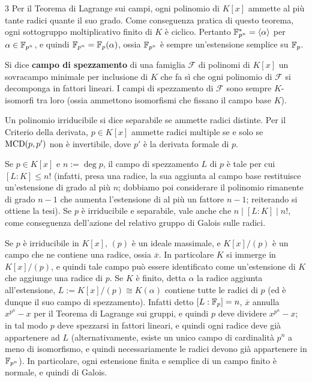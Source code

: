 \documentclass[10pt,landscape]{article}
\begin{document}
\begin{multicols}{3}
	Per il Teorema di Lagrange sui campi, ogni polinomio
	di $K[x]$ ammette al più tante radici quante il suo grado.
	Come conseguenza pratica di questo teorema, ogni sottogruppo
	moltiplicativo finito di $K$ è ciclico. Pertanto
	$\mathbb F_{p^n}^* = \langle \alpha \rangle$ per $\alpha \in \mathbb F_{p^n}$,
	e quindi $\mathbb F_{p^n} = \mathbb F_p(\alpha)$, ossia
	$\mathbb F_{p^n}$ è sempre un'estensione semplice su $\mathbb F_p$. \smallskip

	Si dice
	\textbf{campo di spezzamento} di una famiglia $\mathcal{F}$
	di polinomi di $K[x]$ un sovracampo minimale per
	inclusione di $K$ che fa sì che ogni polinomio di $\mathcal{F}$
	si decomponga in fattori lineari. I campi
	di spezzamento di $\mathcal{F}$ sono sempre
	$K$-isomorfi tra loro (ossia ammettono isomorfismi che fissano
	il campo base $K$). \smallskip

	Un polinomio irriducibile si dice separabile se ammette
	radici distinte. Per il Criterio della derivata,
	$p \in K[x]$ ammette radici multiple se e solo se
	$\operatorname{MCD}(p, p')$ non è invertibile, dove $p'$ è la derivata
	formale di $p$. \smallskip

	Se $p \in K[x]$ e $n := \deg p$, il campo di spezzamento $L$ di $p$ è tale per cui
	$[L : K] \leq n!$ (infatti, presa una radice, la sua aggiunta al campo base
	restituisce un'estensione di grado al più
	$n$; dobbiamo poi considerare il polinomio rimanente di grado $n-1$ che aumenta l'estensione
	di al più un fattore $n-1$; reiterando si ottiene la tesi). Se $p$ è irriducibile e separabile, vale anche che $n \mid [L : K] \mid n!$, come
	conseguenza dell'azione del relativo gruppo di
	Galois sulle radici. \smallskip

	Se $p$ è irriducibile in $K[x]$, $(p)$ è un ideale
	massimale, e $K[x] / (p)$ è un campo che
	ne contiene una radice, ossia $\overline x$. In
	particolare $K$ si immerge in $K[x] / (p)$,
	e quindi tale campo può essere identificato come
	un'estensione di $K$ che aggiunge una radice di $p$.
	Se $K$ è finito, detta $\alpha$ la radice aggiunta
	all'estensione, $L := K[x] / (p) \cong K(\alpha)$ contiene
	tutte le radici di $p$ (ed è dunque il suo campo
	di spezzamento). Infatti detto $[L : \mathbb F_p] = n$,
	$\overline x$ annulla $x^{p^n}-x$ per il Teorema di Lagrange
	sui gruppi, e quindi $p$ deve dividere $x^{p^n}-x$;
	in tal modo $p$ deve spezzarsi in fattori lineari,
	e quindi ogni radice deve già appartenere ad $L$
	(alternativamente, esiste un unico campo di cardinalità $p^n$ a
	meno di isomorfismo, e quindi necessariamente le radici devono
	già appartenere in $\mathbb F_{p^n}$).
	In particolare, ogni estensione finita e semplice
	di un campo finito è normale, e quindi di Galois.


\end{multicols}
\end{document}
